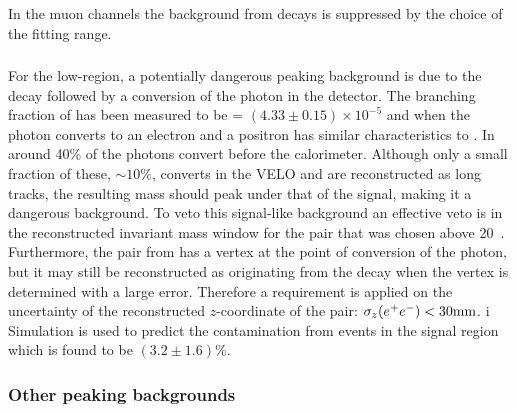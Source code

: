 In the muon channels the background from  decays is suppressed by the choice of the fitting range.


\subsubsection{\BdToKstGee}

For the low-\qsq region, a potentially dangerous peaking background is due to the \BdToKstGee decay followed by a conversion
of the photon in the detector. The branching fraction of \BdToKstGee has been measured to be \BF = $(4.33 \pm 0.15)\times 10^{-5}$ and 
when the photon converts to an electron and a positron has similar characteristics to \BdKstee. 
In \lhcb around 40\% of the photons convert before the calorimeter. Although only a small fraction of these, $\sim 10\%$, converts
in the VELO and are reconstructed as long tracks, the resulting \Bd mass should peak under that of the signal, making it a dangerous background. 
To veto this signal-like background an effective veto is in the reconstructed invariant mass window for the \ee pair that was chosen 
above 20~\mevcc. Furthermore, the \ee pair from \BdToKstGee has a vertex at the point of conversion of the photon, but it may still be
reconstructed as originating from the \Bd decay when the \ee vertex is determined with a large error. 
Therefore a requirement is applied on the uncertainty of the reconstructed $z$-coordinate of the \ee pair: $\sigma_z(e^+ e^-) < 30\rm{mm}$.
i%
Simulation is used to predict the contamination from \BdToKstGee events in the signal region which is found to be $(3.2\pm1.6)\%$.



\subsubsection{Other peaking backgrounds}


